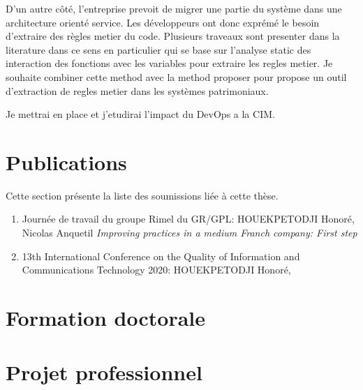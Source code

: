 \documentclass[a4paper]{article}
\begin{document}
D'un autre côté, l'entreprise prevoit de migrer une partie du système dans une architecture orienté service. 
Les développeurs ont donc exprémé le besoin d'extraire des règles metier du code.
Plusieurs traveaux sont presenter dans la literature dans ce sens en particulier  \cite{Lei05a} qui se base sur l'analyse static des interaction des fonctions avec les variables pour extraire les regles metier. 
Je souhaite combiner cette method avec  la method proposer \cite{anqu19a} pour propose un outil d'extraction de regles metier dans les systèmes patrimoniaux.

Je mettrai en place et j'etudirai  l'impact du DevOps a la CIM. 

\section{Publications}

Cette section présente la liste des  soumissions liée à cette thèse.

\begin{enumerate}
  \item Journée de travail du groupe Rimel du GR/GPL: HOUEKPETODJI Honoré, Nicolas Anquetil
  \textit{Improving practices in a medium Franch company: First step}
  \item 13th International Conference on the Quality of Information and Communications Technology 2020: HOUEKPETODJI Honoré,
  
\end{enumerate}

\section{Formation doctorale}


\section{Projet professionnel}



\footnotesize{
 

}
\end{document}
